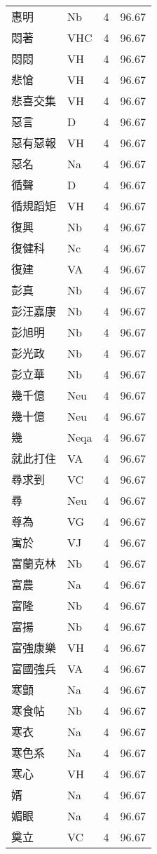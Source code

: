 \documentclass[twocolumn]{book}
\begin{document}
\begin{supertabular}{llrr}
惠明 & Nb & 4 &  96.67\\
悶著 & VHC & 4 &  96.67\\
悶悶 & VH & 4 &  96.67\\
悲愴 & VH & 4 &  96.67\\
悲喜交集 & VH & 4 &  96.67\\
惡言 & D & 4 &  96.67\\
惡有惡報 & VH & 4 &  96.67\\
惡名 & Na & 4 &  96.67\\
循聲 & D & 4 &  96.67\\
循規蹈矩 & VH & 4 &  96.67\\
復興 & Nb & 4 &  96.67\\
復健科 & Nc & 4 &  96.67\\
復建 & VA & 4 &  96.67\\
彭真 & Nb & 4 &  96.67\\
彭汪嘉康 & Nb & 4 &  96.67\\
彭旭明 & Nb & 4 &  96.67\\
彭光政 & Nb & 4 &  96.67\\
彭立華 & Nb & 4 &  96.67\\
幾千億 & Neu & 4 &  96.67\\
幾十億 & Neu & 4 &  96.67\\
幾 & Neqa & 4 &  96.67\\
就此打住 & VA & 4 &  96.67\\
尋求到 & VC & 4 &  96.67\\
尋 & Neu & 4 &  96.67\\
尊為 & VG & 4 &  96.67\\
寓於 & VJ & 4 &  96.67\\
富蘭克林 & Nb & 4 &  96.67\\
富農 & Na & 4 &  96.67\\
富隆 & Nb & 4 &  96.67\\
富揚 & Nb & 4 &  96.67\\
富強康樂 & VH & 4 &  96.67\\
富國強兵 & VA & 4 &  96.67\\
寒顫 & Na & 4 &  96.67\\
寒食帖 & Nb & 4 &  96.67\\
寒衣 & Na & 4 &  96.67\\
寒色系 & Na & 4 &  96.67\\
寒心 & VH & 4 &  96.67\\
婿 & Na & 4 &  96.67\\
媚眼 & Na & 4 &  96.67\\
奠立 & VC & 4 &  96.67\\

\end{supertabular}
\end{document}
